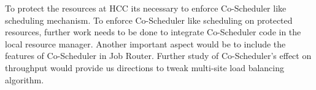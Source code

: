 \documentclass[ms,electronic,double]{nuthesis}
\begin{document}
To protect the resources at HCC its necessary to enforce Co-Scheduler like scheduling mechanism. To enforce Co-Scheduler like scheduling on protected resources, further work needs to be done to integrate Co-Scheduler code in the local resource manager. Another important aspect would be to include the features of Co-Scheduler in Job Router. 
Further study of Co-Scheduler's effect on throughput would provide us directions to tweak multi-site load balancing algorithm.

\backmatter

\appendix




\nocite{*}

\end{document}
